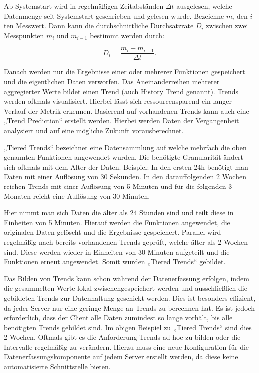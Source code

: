Ab Systemstart wird in regelmäßigen Zeitabständen $\Delta t$ ausgelesen, welche
Datenmenge seit Systemstart geschrieben und gelesen wurde. Bezeichne $m_i$ den
$i$-ten Messwert. Dann kann die durchschnittliche Durchsatzrate $D_i$ zwischen
zwei Messpunkten $m_i$ und $m_{i-1}$ bestimmt werden durch:

\[ D_i = \frac{m_{i} - m_{i-1}}{\Delta t}.\]

Danach werden nur die Ergebnisse einer oder mehrerer Funktionen gespeichert und
die eigentlichen Daten verworfen. Das Aneinanderreihen mehrerer aggregierter
Werte bildet einen Trend (auch History Trend genannt). Trends werden oftmals
visualisiert. Hierbei lässt sich ressourcensparend ein langer Verlauf der
Metrik erkennen. Basierend auf vorhandenen Trends kann auch eine „Trend
Prediction“ erstellt werden. Hierbei werden Daten der Vergangenheit analysiert
und auf eine mögliche Zukunft vorausberechnet.

„Tiered Trends“ bezeichnet eine Datensammlung auf welche mehrfach die oben
genannten Funktionen angewendet wurden. Die benötigte Granularität ändert sich
oftmals mit dem Alter der Daten. Beispiel: In den ersten 24h benötigt man Daten
mit einer Auflösung von 30 Sekunden. In den darauffolgenden 2 Wochen reichen
Trends mit einer Auflösung von 5 Minuten und für die folgenden 3 Monaten reicht
eine Auflösung von 30 Minuten.

Hier nimmt man sich Daten die älter als 24 Stunden sind und teilt diese in
Einheiten von 5 Minuten. Hierauf werden die Funktionen angewendet, die
originalen Daten gelöscht und die Ergebnisse gespeichert. Parallel wird
regelmäßig nach bereits vorhandenen Trends geprüft, welche älter als 2 Wochen
sind. Diese werden wieder in Einheiten von 30 Minuten aufgeteilt und die
Funktionen erneut angewendet. Somit wurden „Tiered Trends“ gebildet.

Das Bilden von Trends kann schon während der Datenerfassung erfolgen, indem die
gesammelten Werte lokal zwischengespeichert werden und ausschließlich die
gebildeten Trends zur Datenhaltung geschickt werden. Dies ist besonders
effizient, da jeder Server nur eine geringe Menge an Trends zu berechnen hat.
Es ist jedoch erforderlich, dass der Client alle Daten zumindest so lange
vorhält, bis alle benötigten Trends gebildet sind. Im obigen Beispiel zu
„Tiered Trends“ sind dies 2 Wochen. Oftmals gibt es die Anforderung Trends ad
hoc zu bilden oder die Intervalle regelmäßig zu verändern. Hierzu muss eine
neue Konfiguration für die Datenerfassungskomponente auf jedem Server erstellt
werden, da diese keine automatisierte Schnittstelle bieten.

